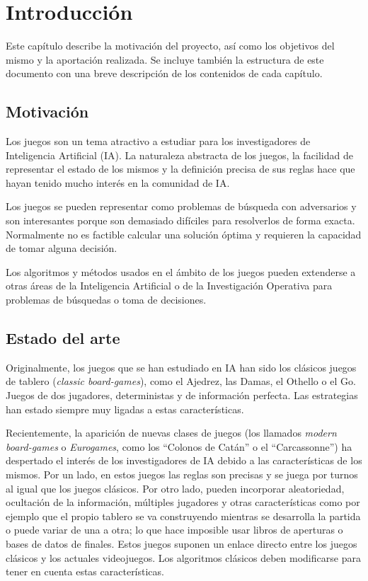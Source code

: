 \chapter{Introducción}
\label{cap:introduccion}
Este capítulo describe la motivación del proyecto, así como los objetivos del mismo y la aportación realizada.
Se incluye también la estructura de este documento con una breve descripción de los contenidos de cada capítulo.

\section{Motivación}
\label{sec:motivacion}
Los juegos son un tema atractivo a estudiar para los investigadores de Inteligencia Artificial (IA).
La naturaleza abstracta de los juegos, la facilidad de representar el estado de los mismos y la definición precisa de sus reglas hace que hayan tenido mucho interés en la comunidad de IA.

Los juegos se pueden representar como problemas de búsqueda con adversarios y son interesantes porque son demasiado difíciles para resolverlos de forma exacta.
Normalmente no es factible calcular una solución óptima y requieren la capacidad de tomar alguna decisión. %

Los algoritmos y métodos usados en el ámbito de los juegos pueden extenderse a otras áreas de la Inteligencia Artificial o de la Investigación Operativa para problemas de búsquedas o toma de decisiones.

\section{Estado del arte}
\label{sec:estado_arte}
Originalmente, los juegos que se han estudiado en IA han sido los clásicos juegos de tablero (\textit{classic board-games}), como el Ajedrez, las Damas, el Othello o el Go.
Juegos de dos jugadores, deterministas y de información perfecta.
Las estrategias han estado siempre muy ligadas a estas características.

Recientemente, la aparición de nuevas clases de juegos (los llamados \textit{modern board-games} o \textit{Eurogames}, como los ``Colonos de Catán'' o el ``Carcassonne'') ha despertado el interés de los investigadores de IA debido a las características de los mismos.
Por un lado, en estos juegos las reglas son precisas y se juega por turnos al igual que los juegos clásicos.
Por otro lado, pueden incorporar aleatoriedad, ocultación de la información, múltiples jugadores y otras características como por ejemplo que el propio tablero se va construyendo mientras se desarrolla la partida o puede variar de una a otra; lo que hace imposible usar libros de aperturas o bases de datos de finales.
Estos juegos suponen un enlace directo entre los juegos clásicos y los actuales videojuegos.
Los algoritmos clásicos deben modificarse para tener en cuenta estas características.


